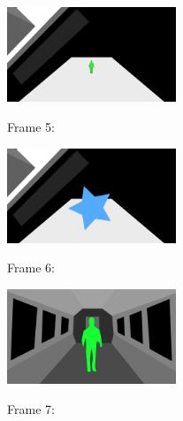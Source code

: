 \documentclass{article}
\begin{document}
\pagebreak

\begin{figure}[!ht]
  \fcapside
  {
    \captionsetup{labelformat=empty}
    \caption{Frame 5:}
  }
  {\includegraphics[width=0.45\textwidth]{Frame5.png}}
\end{figure}

\begin{figure}[!ht]
  \fcapside
  {
    \captionsetup{labelformat=empty}
    \caption{Frame 6:}
  }
  {\includegraphics[width=0.45\textwidth]{Frame6.png}}
\end{figure}

\pagebreak

\begin{figure}[!ht]
  \fcapside
  {
    \captionsetup{labelformat=empty}
    \caption{Frame 7:}
  }
  {\includegraphics[width=0.45\textwidth]{Frame7.png}}
\end{figure}
\end{document}
